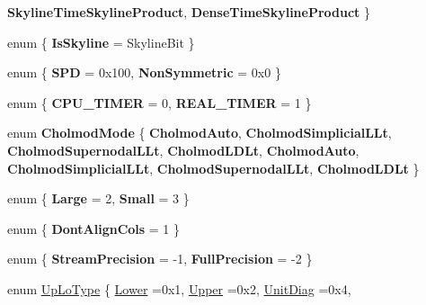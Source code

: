 \begin{DoxyCompactItemize}
{\bfseries Skyline\+Time\+Skyline\+Product}, 
{\bfseries Dense\+Time\+Skyline\+Product}
 \}
\item 
\mbox{\label{namespace_eigen_a1da77b669ae04239776c01a19a0e8274}} 
enum \{ {\bfseries Is\+Skyline} = Skyline\+Bit
 \}
\item 
\mbox{\label{namespace_eigen_a6a4bb4aac8ab95bb2be1f945d456f266}} 
enum \{ {\bfseries S\+PD} = 0x100, 
{\bfseries Non\+Symmetric} = 0x0
 \}
\item 
\mbox{\label{namespace_eigen_ac10c5016e5f9b022fa79cf0cfcb2972d}} 
enum \{ {\bfseries C\+P\+U\+\_\+\+T\+I\+M\+ER} = 0, 
{\bfseries R\+E\+A\+L\+\_\+\+T\+I\+M\+ER} = 1
 \}
\item 
\mbox{\label{namespace_eigen_a8cf3958430069971186dfd7afe6864b3}} 
enum {\bfseries Cholmod\+Mode} \{ \newline
{\bfseries Cholmod\+Auto}, 
{\bfseries Cholmod\+Simplicial\+L\+Lt}, 
{\bfseries Cholmod\+Supernodal\+L\+Lt}, 
{\bfseries Cholmod\+L\+D\+Lt}, 
\newline
{\bfseries Cholmod\+Auto}, 
{\bfseries Cholmod\+Simplicial\+L\+Lt}, 
{\bfseries Cholmod\+Supernodal\+L\+Lt}, 
{\bfseries Cholmod\+L\+D\+Lt}
 \}
\item 
\mbox{\label{namespace_eigen_a85bdb50c855740bca59c822f41bfc883}} 
enum \{ {\bfseries Large} = 2, 
{\bfseries Small} = 3
 \}
\item 
\mbox{\label{namespace_eigen_a0b4f550e1a2549f40e72c0f51de645d4}} 
enum \{ {\bfseries Dont\+Align\+Cols} = 1
 \}
\item 
\mbox{\label{namespace_eigen_af517f344f55487bcf65365dada10cd1b}} 
enum \{ {\bfseries Stream\+Precision} = -\/1, 
{\bfseries Full\+Precision} = -\/2
 \}
\item 
enum \hyperlink{group__enums_ga39e3366ff5554d731e7dc8bb642f83cd}{Up\+Lo\+Type} \{ \newline
\hyperlink{group__enums_gga39e3366ff5554d731e7dc8bb642f83cda891792b8ed394f7607ab16dd716f60e6}{Lower} =0x1, 
\hyperlink{group__enums_gga39e3366ff5554d731e7dc8bb642f83cda6bcb58be3b8b8ec84859ce0c5ac0aaec}{Upper} =0x2, 
\hyperlink{group__enums_gga39e3366ff5554d731e7dc8bb642f83cdaddb72f888ac85d5a1c52333e54f9374b}{Unit\+Diag} =0x4, 

\end{DoxyCompactItemize}
